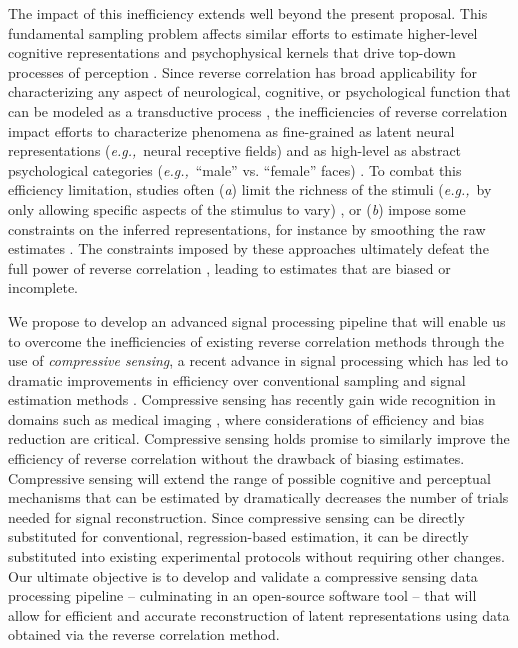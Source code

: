 \documentclass[11pt, notitlepage]{article} %
\def\eg{{\emph{e.g.,}}~}
\begin{document}
The impact of this inefficiency extends well beyond the present proposal.
This fundamental sampling problem affects similar efforts to estimate higher-level
cognitive representations and psychophysical kernels that drive top-down processes of perception
\cite{ahumadaStimulusFeaturesSignal1971,neriReceptivePerceptiveFields2006,gosselinSuperstitiousPerceptionsReveal2003,smithMeasuringInternalRepresentations2012}.
Since reverse correlation has broad applicability for characterizing any aspect
of neurological, cognitive, or psychological function that can be modeled as a transductive process
\cite{ringachReverseCorrelationNeurophysiology2004},
the inefficiencies of reverse correlation impact efforts
to characterize phenomena as fine-grained as latent neural representations (\eg neural receptive fields) \cite{ringachReverseCorrelationNeurophysiology2004}
and as high-level  as abstract psychological categories (\eg ``male'' vs. ``female'' faces)
\cite{brinkmanVisualisingMentalRepresentations2017,ponsotCrackingSocialCode2018,manginiMakingIneffableExplicit2004}.
To combat this efficiency limitation, studies often 
(\emph{a}) limit the richness of the stimuli (\eg by only allowing specific aspects of the stimulus to vary)
\cite{gosselinBubblesTechniqueReveal2001},
or (\emph{b}) impose some constraints on the inferred representations,
for instance by smoothing the raw estimates \cite{gosselinSuperstitiousPerceptionsReveal2003}.
The constraints imposed by these approaches ultimately defeat the full power of reverse correlation
\cite{murrayTroublesBubbles2004},
leading to estimates that are biased or incomplete.

We propose to develop an advanced signal processing pipeline
that will enable us to overcome the inefficiencies of existing reverse correlation methods
through the use of \emph{compressive sensing},
a recent advance in signal processing which has led to dramatic improvements in efficiency
over conventional sampling and signal estimation methods
\cite{baraniukCompressiveSensingLecture2007}.
Compressive sensing has recently gain wide recognition in domains such as medical imaging
\cite{graffCompressiveSensingMedical2015,lustigCompressedSensingMRI2008},
where considerations of efficiency and bias reduction are critical.
Compressive sensing holds promise to similarly improve the efficiency of reverse correlation
without the drawback of biasing estimates.
Compressive sensing will extend the range of possible cognitive and perceptual mechanisms that can be estimated
by dramatically decreases the number of trials needed for signal reconstruction.
Since compressive sensing can be directly substituted for conventional, regression-based estimation,
it can be directly substituted into existing experimental protocols without requiring other changes.
Our ultimate objective is to develop and validate a compressive sensing
data processing pipeline – culminating in an open-source software tool – that will allow for
efficient and accurate reconstruction of latent representations using data 
obtained via the reverse correlation method.
\end{document}
